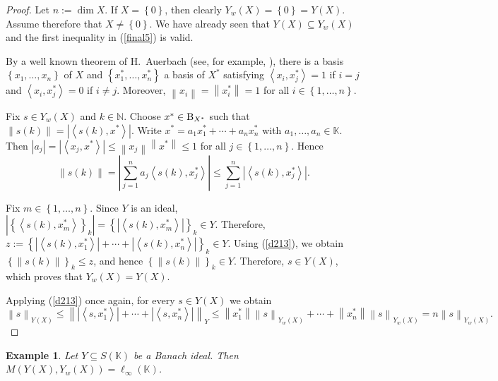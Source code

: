 \documentclass[14pt, a4paper]{article}  %
\providecommand{\llave}[1]{\left\lbrace #1\right\rbrace }
\providecommand{\pare}[1]{\left( #1\right) }
\providecommand{\norm}[1]{\left\lVert#1\right\rVert}
\providecommand{\abs}[1]{\left\lvert#1\right\rvert}
\newcommand{\K}{\mathbb{K}}
\newcommand{\N}{\mathbb{N}}
\newcommand{\B}{\textup{B}}
\newcommand{\la}{\left\langle}
\newcommand{\ra}{\right\rangle}
\newtheorem{example}{Example}[section]  %
\begin{document}
		 \begin{proof}
		 	Let $n:=\dim X$. If $X=\llave{0}$, then clearly $Y_{w}\pare{X}=\llave{0}=Y\pare{X}$. Assume therefore that $X\neq \llave{0}$. We have already seen that $Y\pare{X}\subseteq Y_{w}\pare{X}$ and the first inequality in (\ref{final5}) is valid.
		 	
		 	By a well known theorem of H.~Auerbach (see, for example, \cite[Thm.~II.2.2]{S}), there is a basis $\llave{x_{1},\dots,x_{n}}$ of $X$ and $\llave{x_{1}^{*},\dots,x_{n}^{*}}$ a basis of $X^{*}$ satisfying $\la x_{i},x_{j}^{*}\ra=1$ if $i=j$ and $\la x_{i},x_{j}^{*}\ra=0$ if $i\neq j$. Moreover, $\norm{x_{i}}=\norm{x_{i}^{*}}=1$ for all $i\in\llave{1,\dots,n}$.
		 	
		 	Fix $s\in Y_{w}\pare{X}$ and $k\in\N$. Choose $x^{*}\in\B_{X^{*}}$ such that $\norm{s\pare{k}}=\abs{\la s\pare{k},x^{*}\ra}$. Write $x^{*}=a_{1}x_{1}^{*}+\cdots+a_{n}x_{n}^{*}$ with $a_{1},\dots,a_{n}\in\K$. Then $\abs{a_{j}}=\abs{\la x_{j},x^{*}\ra}\leq \norm{x_{j}}\norm{x^{*}}\leq 1$ for all $j\in\llave{1,\dots,n}$. Hence
		 	\begin{equation}\label{d213}
		 		\norm{s\pare{k}}=\abs{\sum_{j=1}^{n}a_{j}\la s\pare{k},x_{j}^{*}\ra}\leq \sum_{j=1}^{n}\abs{\la s\pare{k},x_{j}^{*}\ra}.
		 	\end{equation}
		 	
		 	Fix $m\in\llave{1,\dots,n}$. Since $Y$ is an ideal, $\abs{\llave{\la s\pare{k},x_{m}^{*}\ra}_{k}}=\llave{\abs{\la s\pare{k},x_{m}^{*}\ra}}_{k}\in Y$. Therefore,
		 	$
		 	z:=\llave{\abs{\la s\pare{k},x_{1}^{*}\ra}+\cdots+\abs{\la s\pare{k},x_{n}^{*}\ra}}_{k}\in Y.
		 	$
		 	Using (\ref{d213}), we obtain $\llave{\norm{s\pare{k}}}_{k}\leq z$, and hence $\llave{\norm{s\pare{k}}}_{k}\in Y$. Therefore, $s\in Y\pare{X}$, which proves that $Y_{w}\pare{X}=Y\pare{X}$.
		 	
		 	Applying (\ref{d213}) once again, for every $s\in Y\pare{X}$ we obtain
		 	\begin{equation}
		 		\norm{s}_{Y\pare{X}}
		 		 \leq \norm{\abs{\la s,x_{1}^{*}\ra}+\cdots+\abs{\la s,x_{n}^{*}\ra}}_{Y} \leq \norm{x_{1}^{*}}\norm{s}_{Y_{w}\pare{X}}+\cdots+\norm{x_{n}^{*}}\norm{s}_{Y_{w}\pare{X}} = n\norm{s}_{Y_{w}\pare{X}}. 
		 	\end{equation}
		 \end{proof}
		
	 \begin{example}
	 	Let $Y\subseteq S\pare{\K}$ be a Banach ideal. Then $M(Y(X),Y_w (X))=\ell_{\infty}\pare{\K}$.
	 \end{example}
		
\end{document}
